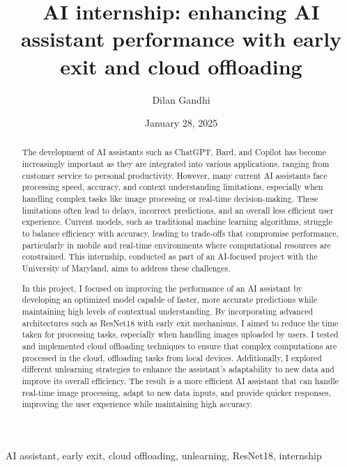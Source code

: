 ﻿\documentclass[12pt,conference,onecolumn]{IEEEtran}
\title{AI internship: enhancing AI assistant performance with early exit and cloud offloading}
\author{Dilan Gandhi}
\date{January 28, 2025}
\begin{document}
\maketitle 

\begin{abstract}
The development of AI assistants such as ChatGPT, Bard, and Copilot has become increasingly important as they are integrated into various applications, ranging from customer service to personal productivity. However, many current AI assistants face processing speed, accuracy, and context understanding limitations, especially when handling complex tasks like image processing or real-time decision-making. These limitations often lead to delays, incorrect predictions, and an overall less efficient user experience. Current models, such as traditional machine learning algorithms, struggle to balance efficiency with accuracy, leading to trade-offs that compromise performance, particularly in mobile and real-time environments where computational resources are constrained. This internship, conducted as part of an AI-focused project with the University of Maryland, aims to address these challenges.

In this project, I focused on improving the performance of an AI assistant by developing an optimized model capable of faster, more accurate predictions while maintaining high levels of contextual understanding. By incorporating advanced architectures such as ResNet18 with early exit mechanisms, I aimed to reduce the time taken for processing tasks, especially when handling images uploaded by users. I tested and implemented cloud offloading techniques to ensure that complex computations are processed in the cloud, offloading tasks from local devices. Additionally, I explored different unlearning strategies to enhance the assistant's adaptability to new data and improve its overall efficiency. The result is a more efficient AI assistant that can handle real-time image processing, adapt to new data inputs, and provide quicker responses, improving the user experience while maintaining high accuracy.
\end{abstract}

\begin{IEEEkeywords}
AI assistant, early exit, cloud offloading, unlearning, ResNet18, internship
\end{IEEEkeywords}
\end{document}
